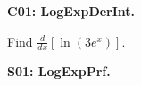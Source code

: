 \documentclass[12pt]{article}
\newcommand{\<}{\left\langle}
\renewcommand{\>}{\right\rangle}
\newcommand{\exerciseHeader}[4]{


  \vspace{0.5em}
  \textbf{#2}
  \vspace{0.5em}

}
\begin{document}
\begin{multicols}{2}

%
%
%
%

%
%
%
%

%

%

\exerciseHeader{2017 June 07}{C01: LogExpDerInt.}{
Find derivatives and integrals involving logrithmic and exponential functions.
}{Extra}

Find \(\frac{d}{dx}[\ln(3e^x)]\).



%

%

%

\exerciseHeader{2017 June 07}{S01: LogExpPrf.}{
Derive properties of the logarithmic and exponential functions from their definitions.
}{3/3}


\end{multicols}
\end{document}
